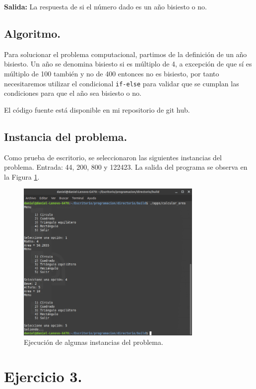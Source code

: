 \documentclass[12pt,letterpaper]{article}
\begin{document}
{\textbf{Salida:} La respuesta de si el n\'umero dado es un año bisiesto o no.

\subsection{Algoritmo.}
Para solucionar el problema computacional, partimos de la definici\'on de un año bisiesto. Un año se denomina bisiesto si es m\'ultiplo de 4, a excepci\'on de que s\'i es m\'ultiplo de 100 tambi\'en y no de 400 entonces no es bisiesto, por tanto necesitaremos utilizar el condicional \texttt{if-else} para validar que se cumplan las condiciones para que el año sea bisiesto o no.


El código fuente está disponible en mi repositorio de git hub. \cite{url:basilea}

\subsection{Instancia del problema.}
Como prueba de escritorio, se seleccionaron las siguientes instancias del problema. Entrada: 44, 200, 800 y 122423. La salida del programa se observa en la Figura \ref{fig:bisiesto}.
\begin{figure}[ht!]
  \centering
  \includegraphics[width=0.8\textwidth]{figures/calcular_area}
  \caption{Ejecución de algunas instancias del problema.}
  \label{fig:bisiesto}
\end{figure}

\section{Ejercicio 3.}

}
\end{document}
